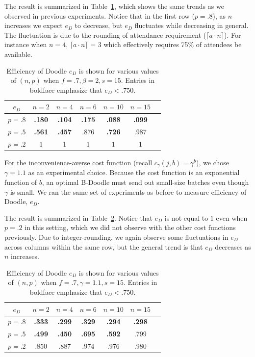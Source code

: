 The result is summarized in Table~\ref{bdoodle:table:DoodleEfficiency-lower-attendance_time_averse}, which shows the same trends as we observed in previous experiments. Notice that in the first row ($p = .8$), as $n$ increases we expect $e_{D}$ to decrease, but $e_{D}$ fluctuates while decreasing in general. The fluctuation is due to the rounding of attendance requirement ($\lceil a \cdot n \rceil$). For instance when $n = 4$, $\lceil a \cdot n \rceil$ = 3 which effectively requires 75\% of attendees be available. 
\begin{table}[h]  \small
\centering
\begin{tabular}{|c|c|c|c|c|c|c|}
	\hline
	$e_{D}$ & $n = 2$ & $n = 4$ & $n = 6$ & $ n = 10 $ & $n = 15$ \\ \hline
	$p = .8$ & \textbf{.180} & \textbf{.104} & \textbf{.175} & \textbf{.088} & \textbf{.099} \\ \hline
	$p = .5$ & \textbf{.561} & \textbf{.457} & .876 & \textbf{.726} & .987  \\ \hline
	$p = .2$ & 1 & 1 & 1 & 1 & 1\\ \hline	
\end{tabular}
\caption{Efficiency of Doodle $e_{D}$ is shown for various values of $(n, p)$ when $f = .7, \beta=2, s = 15$.
Entries in boldface emphasize that $e_{D} < .750$.
} \label{bdoodle:table:DoodleEfficiency-lower-attendance_time_averse}
\end{table}

For the inconvenience-averse cost function (recall $c_{\gamma}(j, b) = \gamma^{b}$), we chose $\gamma = 1.1$ as an experimental choice. Because the cost function is an exponential function of $b$, an optimal B-Doodle must send out small-size batches even though $\gamma$ is small. We ran the same set of experiments as before to measure efficiency of Doodle, $e_{D}$. 

The result is summarized in Table~\ref{bdoodle:table:DoodleEfficiency-lower-attendance_inconvenience_averse}. Notice that $e_{D}$ is not equal to $1$ even when $p = .2$ in this setting, which we did not observe with the other cost functions previously. Due to integer-rounding, we again observe some fluctuations in $e_{D}$ across columns within the same row, but the general trend is that $e_{D}$ decreases as $n$ increases.
\begin{table}[h]   \small
\centering
\begin{tabular}{|c|c|c|c|c|c|c|}
	\hline
	$e_{D}$ & $n = 2$ & $n = 4$ & $n = 6$ & $ n = 10 $ & $n = 15$ \\ \hline
	$p = .8$ & \textbf{.333} & \textbf{.299} & \textbf{.329} & \textbf{.294} & \textbf{.298} \\ \hline
	$p = .5$ & \textbf{.499} & \textbf{.450} & \textbf{.695} & \textbf{.592} & .799  \\ \hline
	$p = .2$ & .850 & .887 & .974 & .976 & .980 \\ \hline	
\end{tabular}
\caption{Efficiency of Doodle $e_{D}$ is shown for various values of $(n, p)$ when $f = .7, \gamma=1.1, s = 15$.
Entries in boldface emphasize that $e_{D} < .750$.
} \label{bdoodle:table:DoodleEfficiency-lower-attendance_inconvenience_averse}
\end{table}

